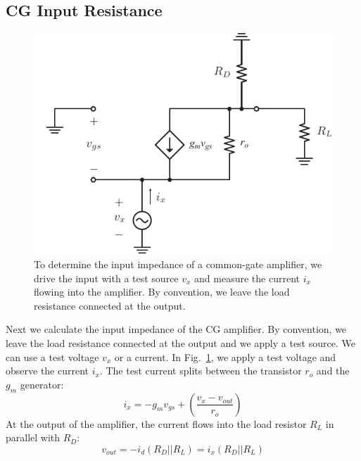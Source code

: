 \subsection{CG Input Resistance}
\begin{figure}[tb]
\centering
\includegraphics[scale=.9]{cgamp_is_ac_ss_zin}
\caption{To determine the input impedance of a common-gate amplifier, we drive the input with a test source $v_x$ and measure the current $i_x$ flowing into the amplifier.  By convention, we leave the load resistance connected at the output.}
\label{fig:cgamp_is_ac_ss_zin}
\end{figure}
Next we calculate the input impedance of the CG amplifier.  By convention, we leave the load resistance connected at the output and we apply a test source.  We can use a test voltage $v_x$ or a current.  In Fig.~\ref{fig:cgamp_is_ac_ss_zin}, we apply a test voltage and observe the current $i_x$.  The test current splits between the transistor $r_o$ and the $g_m$ generator:
    \begin{equation}
        {i_x} =  - {g_m}{v_{gs}} + \left( {\frac{{{v_x} - {v_{out}}}}{{{r_o}}}} \right) \label{eq:cg_input}
    \end{equation}
At the output of the amplifier, the current flows into the load resistor $R_L$ in parallel with $R_D$:
    \begin{equation}
        {v_{out}} =  - {i_d}({R_D}||{R_L}) = {i_x}({R_D}||{R_L})
    \end{equation}
